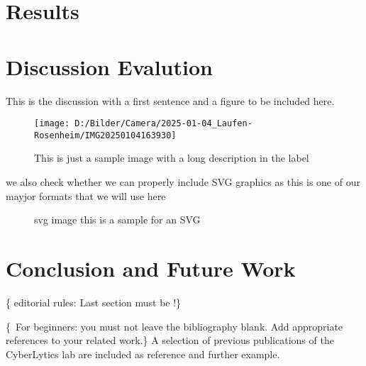 \documentclass[conference,flushend]{iaria}
\begin{document}
\section{Results}
\lipsum[24]

\section{Discussion \textbar{} Evalution}
This is the discussion with a first sentence and a figure to be included here.

\begin{figure}[ht]
	\centering
	\texttt{[image: D:/Bilder/Camera/2025-01-04\_Laufen-Rosenheim/IMG20250104163930]}
	\caption[Sample image]{This is just a sample image with a long description in the label}
	\label{fig:img_sample1}
\end{figure}

we also check whether we can properly include SVG graphics as this is one of our mayjor formats that we will use here


\begin{figure}[htbp]
	\centering
	
	\caption{svg image this is a sample for an SVG}
\end{figure}

\lipsum[25]

\section{Conclusion and Future Work}
\{\faWarning{}  editorial rules: Last section must be !\}
\lipsum[26]

\{\,\faWarning{} For beginners: you must not leave the bibliography blank. Add appropriate references to your related work.\}
%
A selection of previous   publications of the CyberLytics lab
%
%
\cite{%
LeNe24goalHijackingLLMs,%
LeNe24vocattllm,%
PANP23seccloudfogai,%
StNe23foodfresh}
%
%
are included as reference and further example.

\begingroup
\sloppy
\printbibliography
\endgroup 
\end{document}
